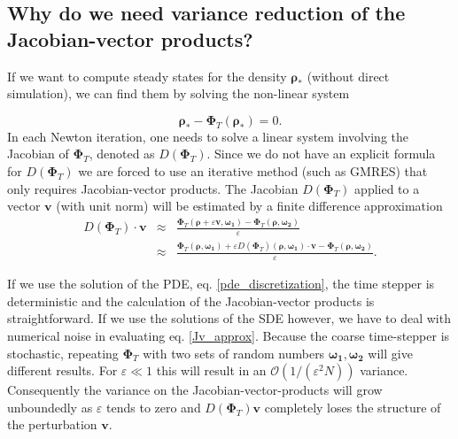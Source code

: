 \documentclass[]{article}
\newcommand{\U}{\ensuremath{\boldsymbol{\rho}}}
\newcommand{\cts}{\ensuremath{\boldsymbol{\Phi}_T}} %
\newcommand{\V}{\ensuremath{\mathbf{v}}}
\begin{document}
\subsection{Why do we need variance reduction of the Jacobian-vector products?  \label{section:Jv}}



If we want to compute steady states for the density $\U_*$ (without direct simulation), we can find them by solving the non-linear system

\begin{equation}
  \U_* - \cts(\U_*) =0.
\end{equation}
In each Newton iteration, one needs to solve a linear system involving the Jacobian of \cts, denoted as $D(\cts)$.  Since we do not have an explicit formula for
$D(\cts)$ we are forced to use an iterative method (such as GMRES) that only
requires Jacobian-vector products. 
The Jacobian $D(\cts)$ applied to a vector $\mathbf{v}$ (with unit norm) will be estimated by a finite difference approximation
\begin{eqnarray}
\label{Jv_approx}
D(\cts) \cdot \mathbf{v} &\approx& \frac{\cts (\U + \varepsilon \mathbf{v}, \boldsymbol{\omega_1} )  - \cts (\U, \boldsymbol{\omega_2})}{\varepsilon} \\
&\approx & \frac{\cts (\U, \boldsymbol{\omega_1} )  + \varepsilon D(\cts) (  \U, \boldsymbol{\omega_1})  \cdot \mathbf{v}  - \cts (\U, \boldsymbol{\omega_2}) }{\varepsilon} \nonumber
.
\end{eqnarray}

If we use the solution of the PDE, eq. \eqref{pde_discretization}, the time stepper is deterministic and the calculation of the Jacobian-vector products is straightforward. If we use the solutions of the SDE however, we have to deal with numerical noise in evaluating eq. \ref{Jv_approx}.
Because the coarse time-stepper is stochastic, repeating $\cts$ with two sets of random numbers $\boldsymbol{\omega_1},  \boldsymbol{\omega_2}$  will give different results. For $ \varepsilon \ll 1$ this will result in an $\mathcal{O}(1/(\varepsilon^2 N))$ variance. Consequently the variance on the Jacobian-vector-products will grow unboundedly as $\varepsilon$ tends to zero and $D(\cts) \mathbf{v}$ completely loses the structure of the perturbation \V.
\end{document}
